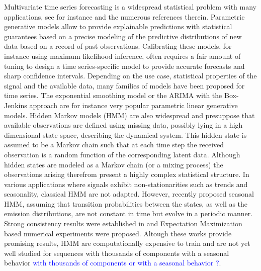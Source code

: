\documentclass{article} %
\begin{document}
Multivariate time series forecasting is a widespread statistical problem with  many applications, see for instance \citep{sarkka2013bayesian, douc2014nonlinear, zucchini2017hidden} and the numerous references therein.
 Parametric generative models allow to provide explainable predictions with statistical guarantees based on a precise modeling of the predictive distributions of new data based on a record of past observations. %
Calibrating these models, for instance using maximum likelihood inference, often requires a fair amount of tuning to design a time series-specific model to provide  accurate forecasts and sharp confidence intervals.  Depending on the use case, statistical properties of the signal and the available data, many families of models have been proposed for time series.  The exponential smoothing model \citep{RePEc:inm:oropre:v:9:y:1961:i:5:p:673-685} or the ARIMA with the Box-Jenkins approach \citep{box2015time} are for instance very popular parametric linear generative models.  Hidden Markov models (HMM) are also widespread and presuppose that available observations are defined using missing data, possibly lying in a high dimensional state space, describing the dynamical system. This hidden state is assumed to be a Markov chain such that at each time step the received observation is a random function of the corresponding latent data.  Although hidden states are modeled as a Markov chain (or a mixing process)  the observations arising therefrom present a highly complex statistical structure. %
 In various applications where signals exhibit non-stationarities such as trends and seasonality, classical HMM are not adapted. However, \citep{touron2017modeling}  recently proposed seasonal HMM, assuming that transition probabilities between the states, as well as the emission distributions, are not constant in time but evolve in a periodic manner. Strong consistency results were established in \citep{touron2019consistency} and Expectation Maximization based numerical experiments were proposed.
Altough these works provide promising results, HMM are computationally expensive to train and are not yet well studied for sequences with thousands of components with a seasonal behavior \textcolor{blue}{with thousands of components or with a seasonal behavior ?}.
 
\end{document}

